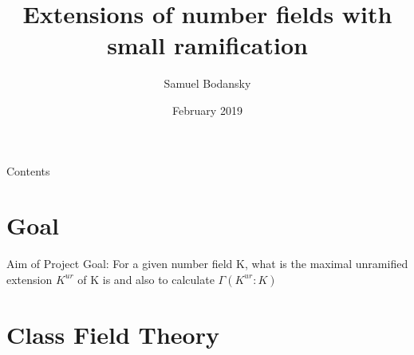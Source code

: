 \documentclass[10pt]{beamer}
\title[Part C Dissertation] %
{Extensions of number fields with small ramification}
\subtitle
{}
\author %
{Samuel Bodansky}
\institute %
{
  University of Oxford
  }
\date %
{February 2019}
\theoremstyle{plain} %
\begin{document}
\begin{frame}
  \titlepage
\end{frame}
\begin{frame}{Contents}
\tableofcontents
\end{frame}

\section{Goal}
\begin{frame}{Aim of Project}
Goal: For a given number field K, what is the maximal unramified extension $K^{ur}$ of K is and also to calculate $\Gamma(K^{ur}:K)$

\end{frame}

\section{Class Field Theory}
\end{document}
